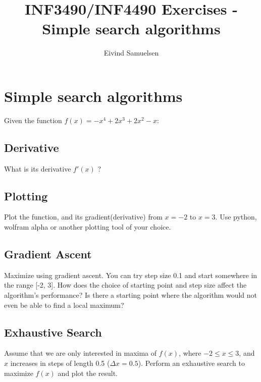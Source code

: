 
\title{\vspace{-2cm}INF3490/INF4490 Exercises - Simple search algorithms}
\author{Eivind Samuelsen}
\date{}

\setlength\parindent{0pt}


    \renewcommand\marginsymbol[1][0pt]{%
  \tabto*{0cm}\makebox[-1cm][c]{$\mathbb{P}$}\tabto*{\TabPrevPos}}

\maketitle


\section{Simple search algorithms}

Given the function \(f(x) = -x^4 + 2x^3 + 2x^2 - x\):

\subsection{Derivative}
What is its derivative \(f'(x)\) ?

\subsection{Plotting \marginsymbol}
Plot the function, and its gradient(derivative) from \(x=-2\) to \(x=3\).
Use python, wolfram alpha or another plotting tool of your choice.

\subsection{Gradient Ascent \marginsymbol}
\label{subsec:grada}
Maximize using gradient ascent.
You can try step size 0.1 and start somewhere in the range [-2, 3].
How does the choice of starting point and step size affect the algorithm's performance?
Is there a starting point where the algorithm would not even be able to find a local maximum?

\subsection{Exhaustive Search \marginsymbol}
\label{subsec:exhaust}
Assume that we are only interested in maxima of \(f(x)\),
where \(-2\leq x \leq 3\),
and \(x\) increases in steps of length 0.5 (\(\Delta x = 0.5\)).
Perform an exhaustive search to maximize \(f(x)\) and plot the result.


